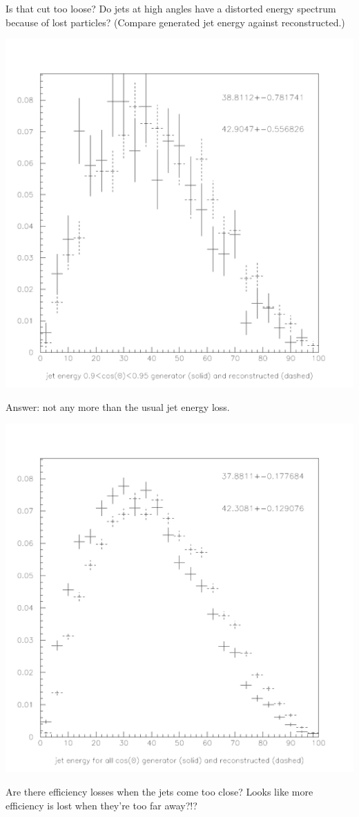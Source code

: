 \documentclass[landscape]{article}
\begin{document}
Is that cut too loose?  Do jets at high angles have a distorted energy
spectrum because of lost particles?  (Compare generated jet energy
against reconstructed.)

\vfill

\includegraphics[width=0.7\linewidth]{high-angle_energy_distortion.pdf}

\pagebreak

Answer: not any more than the usual jet energy loss.

\vfill

\includegraphics[width=0.7\linewidth]{high-angle_energy_distortion3.pdf}

\pagebreak

Are there efficiency losses when the jets come too close?  Looks like
more efficiency is lost when they're too far away?!?
\end{document}
